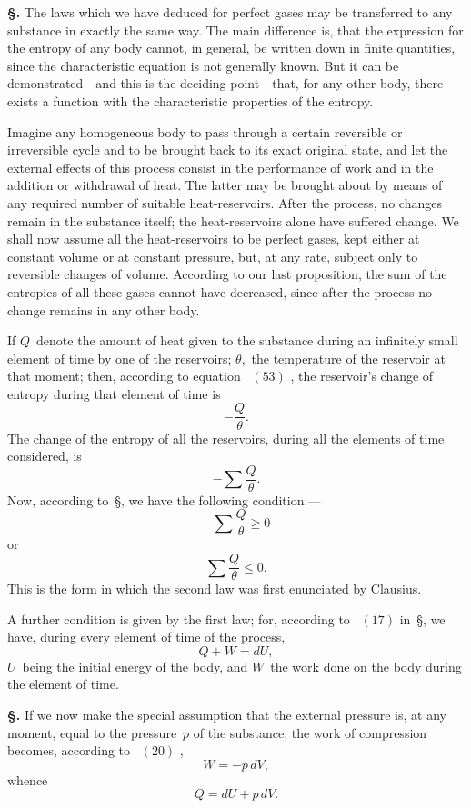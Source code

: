 \documentclass[12pt]{book}[2005/09/16]
\newcommand{\Section}[1]{
  \medskip\par\textbf{§\;#1}
  \label{section:#1}
}
\newcommand{\SecRef}[2][§\;]{\hyperref[section:#2.]{{\upshape #1#2}}}
\newcommand{\Eq}[1]{%
  \hyperref[eqn:#1]{\ensuremath{#1}}%
}
\newcommand{\PageSep}[1]{\ignorespaces}
\newcommand{\tsum}{\mathop{\textstyle\sum}\limits}
\begin{document}
\Section{128.} The laws which we have deduced for perfect gases
may be transferred to any substance in exactly the same
way. The main difference is, that the expression for the
entropy of any body cannot, in general, be written down
in finite quantities, since the characteristic equation is not
generally known. But it can be demonstrated---and this is
the deciding point---that, for any other body, there exists a
function with the characteristic properties of the entropy.

Imagine any homogeneous body to pass through a certain
reversible or irreversible cycle and to be brought back
to its exact original state, and let the external effects of
this process consist in the performance of work and in the
addition or withdrawal of heat. The latter may be brought
about by means of any required number of suitable heat-reservoirs.
After the process, no changes remain in the
substance itself; the heat-reservoirs alone have suffered
change. We shall now assume all the heat-reservoirs to be
perfect gases, kept either at constant volume or at constant
pressure, but, at any rate, subject only to reversible changes
of volume. According to our last proposition, the sum of
the entropies of all these gases cannot have decreased, since
after the process no change remains in any other body.

If $Q$~denote the amount of heat given to the substance
during an infinitely small element of time by one of the
reservoirs; $\theta$,~the temperature of the reservoir at that
moment; then, according to equation~\Eq{(53)}, the reservoir's
change of entropy during that element of time is
\[
-\frac{Q}{\theta}.
\]
The change of the entropy of all the reservoirs, during all
the elements of time considered, is
\[
-\tsum \frac{Q}{\theta}.
\]
\PageSep{96}
%
Now, according to~\SecRef{126}, we have the following condition:---
\[
-\tsum \frac{Q}{\theta} \geq 0
\]
or
\[
\tsum \frac{Q}{\theta} \leq 0.
\]
This is the form in which the second law was first enunciated
by Clausius.

A further condition is given by the first law; for, according
to~\Eq{(17)} in~\SecRef{63}, we have, during every element of
time of the process,
\[
Q + W = dU,
\]
$U$~being the initial energy of the body, and $W$~the work
done on the body during the element of time.

\Section{129.} If we now make the special assumption that the
external pressure is, at any moment, equal to the pressure~$p$
of the substance, the work of compression becomes,
according to~\Eq{(20)},
\[
W = -p\, dV,
\]
whence
\[
Q = dU + p\, dV.
\]
\end{document}
